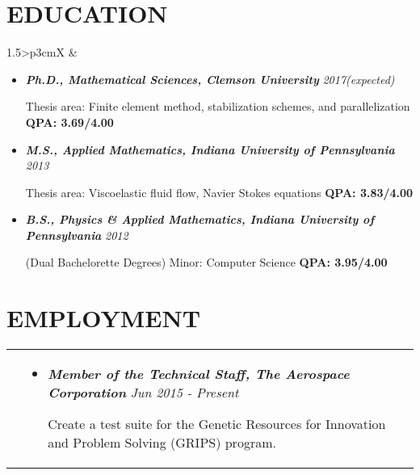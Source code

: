 \documentclass[10pt]{article}
\begin{document}
\section{\textbf{EDUCATION}}
\vspace*{-\baselineskip}
\hskip-1.7in
\begin{tabularx}{1.5\linewidth}{>{\raggedleft\scshape}p{3cm}X}
  &\begin{itemize}
    \setlength\itemsep{.005em}
  \item \textbf{\textit{Ph.D., Mathematical Sciences, Clemson University}}  \hspace{44 mm} \textit{2017(expected)}
  
             Thesis area: Finite element method, stabilization schemes, and parallelization \textbf{QPA: 3.69/4.00}
             
\item \textbf{\textit{M.S., Applied Mathematics, Indiana University of Pennsylvania}} \hspace{20.5 mm} \textit{2013}
  
             Thesis area: Viscoelastic fluid flow, Navier Stokes equations \textbf{QPA: 3.83/4.00}
             
\item \textbf{\textit{B.S., Physics \& Applied Mathematics, Indiana University of Pennsylvania}} \hspace{3 mm}\textit{2012}
  
             (Dual Bachelorette Degrees) Minor: Computer Science \textbf{QPA: 3.95/4.00}
             
  \end{itemize} 

\end{tabularx}

\section{\textbf{EMPLOYMENT}}
\vspace*{-\baselineskip}
\hskip-1.7in
\begin{tabularx}{1.5\linewidth}{>{\raggedleft\scshape}p{3cm}X}

  &\begin{itemize}
    \setlength\itemsep{.005em}
  \item \textbf{\textit{Member of the Technical Staff, The Aerospace Corporation}}    \hspace{17 mm}\textit{Jun 2015 - Present}
  
Create a test suite for the Genetic Resources for Innovation and Problem Solving (GRIPS) program. 
               
  \end{itemize} 

\end{tabularx}
\end{document}
